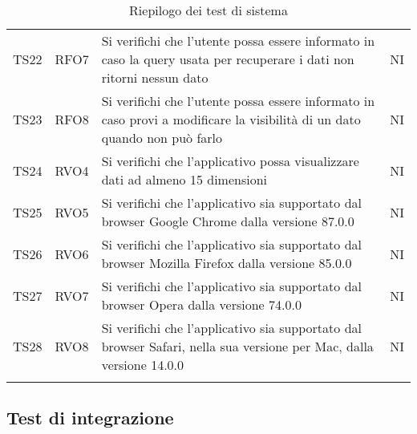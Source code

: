 \documentclass[../piano_di_qualifica.tex]{subfiles}
\begin{document}
\begin{center}
\begin{longtable}{|c|c|p{8cm}|c|}
		TS22              & RFO7                   & Si verifichi che l'utente possa essere informato in caso la query usata per recuperare i dati non ritorni nessun dato     & NI                         \\
		TS23              & RFO8                   & Si verifichi che l'utente possa essere informato in caso provi a modificare la visibilità di un dato quando non può farlo & NI                         \\
		TS24              & RVO4                   & Si verifichi che l'applicativo possa visualizzare dati ad almeno 15 dimensioni                                            & NI                         \\
		TS25              & RVO5                   & Si verifichi che l'applicativo sia supportato dal browser Google Chrome dalla versione 87.0.0                             & NI                         \\
		TS26              & RVO6                   & Si verifichi che l'applicativo sia supportato dal browser Mozilla Firefox dalla versione 85.0.0                           & NI                         \\
		TS27              & RVO7                   & Si verifichi che l'applicativo sia supportato dal browser Opera dalla versione 74.0.0                                     & NI                         \\
		TS28              & RVO8                   & Si verifichi che l'applicativo sia supportato dal browser Safari, nella sua versione per Mac, dalla versione 14.0.0       & NI                         \\
		\hline
		\rowcolor{white}
		\caption{Riepilogo dei test di sistema}
	\end{longtable}
\end{center}

\subsection{Test di integrazione}%
\label{sub:test_int}
\end{document}
